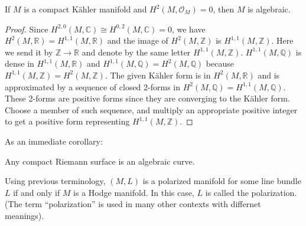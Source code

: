\documentclass[12pt]{article}
\begin{document}
\begin{corollary}
  If \(M\) is a compact Kähler manifold and \(H^2(M,\mathcal{O}_M)=0\), then \(M\)
  is algebraic.
\end{corollary}
\begin{proof}
  Since \(H^{2,0}(M,\mathbb{C})\cong H^{0,2}(M,\mathbb{C})=0\), we have
  \(H^2(M,\mathbb{R})=H^{1,1}(M,\mathbb{R})\) and the image of \(H^2(M,\mathbb{Z})\) is
  \(H^{1,1}(M,\mathbb{Z})\). Here we send it by \(\mathbb{Z}\to \mathbb{R}\) and
  denote by the same letter \(H^{1,1}(M,\mathbb{Z})\). \(H^{1,1}(M,\mathbb{Q})\) is
  dense in \(H^{1,1}(M,\mathbb{R})\) and \(H^{1,1}(M,\mathbb{Q})=H^2(M,\mathbb{Q})\)
  because \(H^{1,1}(M,\mathbb{Z})=H^2(M,\mathbb{Z})\). The given Kähler form is
  in \(H^2(M,\mathbb{R})\) and is approximated by a sequence of closed 2-forms
  in \(H^2(M,\mathbb{Q})=H^{1,1}(M,\mathbb{Q})\). These 2-forms are positive forms
  since they are converging to the Kähler form. Choose a member of such sequence,
  and multiply an appropriate positive integer to get a positive form representing
  \(H^{1,1}(M,\mathbb{Z})\).
\end{proof}
As an immediate corollary:
\begin{corollary}
  Any compact Riemann surface is an algebraic curve.
\end{corollary}

Using previous terminology, \((M,L)\) is a polarized manifold for some line bundle
\(L\) if and only if \(M\) is a Hodge manifold. In this case, \(L\) is called the
polarization. (The term ``polarization'' is used in many other contexts with differnet
meanings).
\end{document}
